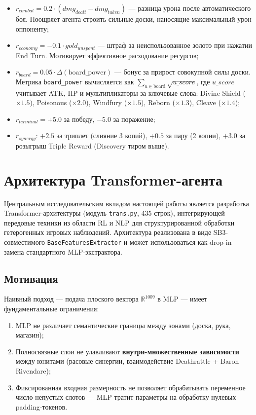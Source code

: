 \documentclass[a4paper,12pt]{extarticle}
\begin{document}
\begin{itemize}[noitemsep]
  \item $r_{combat} = 0.2 \cdot (dmg_{dealt} - dmg_{taken})$ --- разница урона после автоматического боя. Поощряет агента строить сильные доски, наносящие максимальный урон оппоненту;
  \item $r_{economy} = -0.1 \cdot gold_{unspent}$ --- штраф за неиспользованное золото при нажатии End Turn. Мотивирует эффективное расходование ресурсов;
  \item $r_{board} = 0.05 \cdot \Delta(\text{board\_power})$ --- бонус за прирост совокупной силы доски. Метрика \texttt{board\_power} вычисляется как $\sum_{u \in \text{board}} \sqrt{u\_score}$, где $u\_score$ учитывает ATK, HP и мультипликаторы за ключевые слова: Divine Shield ($\times 1.5$), Poisonous ($\times 2.0$), Windfury ($\times 1.5$), Reborn ($\times 1.3$), Cleave ($\times 1.4$);
  \item $r_{terminal} = +5.0$ за победу, $-5.0$ за поражение;
  \item $r_{synergy}$: $+2.5$ за триплет (слияние 3 копий), $+0.5$ за пару (2 копии), $+3.0$ за розыгрыш Triple Reward (Discovery тиром выше).
\end{itemize}

\newpage

\section{Архитектура Transformer-агента}

Центральным исследовательским вкладом настоящей работы является разработка Transformer-архитектуры (модуль \texttt{trans.py}, 435 строк), интегрирующей передовые техники из области RL и NLP для структурированной обработки гетерогенных игровых наблюдений. Архитектура реализована в виде SB3-совместимого \texttt{BaseFeaturesExtractor} и может использоваться как drop-in замена стандартного MLP-экстрактора.

\subsection{Мотивация}

Наивный подход --- подача плоского вектора $\mathbb{R}^{1009}$ в MLP --- имеет фундаментальные ограничения:
\begin{enumerate}[noitemsep]
  \item MLP не различает семантические границы между зонами (доска, рука, магазин);
  \item Полносвязные слои не улавливают \textbf{внутри-множественные зависимости} между юнитами (расовые синергии, взаимодействие Deathrattle + Baron Rivendare);
  \item Фиксированная входная размерность не позволяет обрабатывать переменное число непустых слотов --- MLP тратит параметры на обработку нулевых padding-токенов.
\end{enumerate}
\end{document}
